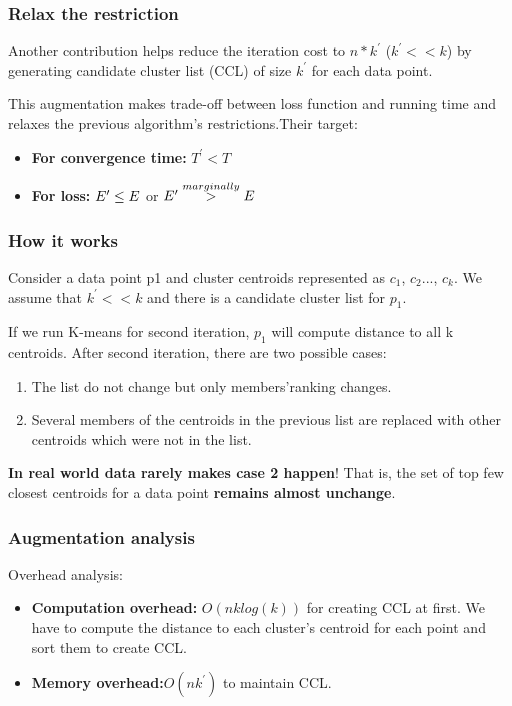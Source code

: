 \documentclass[9pt]{beamer}
\newcommand{\ccp}[1]{{\color{purple}#1}}
\begin{document}
\begin{frame}
	\frametitle{Relax the restriction}
	Another contribution helps reduce the iteration cost to $n * k^{\prime}$ ($k^{\prime} << k$) by generating \ccp{candidate cluster list (CCL)} of size $k^{\prime}$ for each data point. \par
	This augmentation makes trade-off between loss function and running time and relaxes the previous algorithm's restrictions.Their target:
	\begin{itemize}
		\item \textbf{For convergence time:} $T^{\prime} < T$
		\item \textbf{For loss:} $E^{\prime} \le E \space $ or $ \space E^{\prime} \overset{marginally}{>} E$
	\end{itemize}
\end{frame}

\begin{frame}
	\frametitle{How it works}
	Consider a data point p1 and cluster centroids represented as $c_1$, $c_2$..., $c_k$. We assume that $k^{\prime} << k $ and there is a candidate cluster list for $p_1$.\par
	\pause
	If we run K-means for second iteration, $p_1$ will compute distance to all k centroids. After second iteration, there are two possible cases:
	\begin{enumerate}
		\item The list do not change but only members'ranking changes.
		\item Several members of the centroids in the previous list are replaced with other centroids which were not in the list.
	\end{enumerate}
	\textbf{In real world data rarely makes case 2 happen}! That is, the set of top few closest centroids for a data point \textbf{remains almost unchange}.
\end{frame}

\begin{frame}
	\frametitle{Augmentation analysis}
	Overhead analysis:
	\begin{itemize}
		\item \textbf{Computation overhead:} $O(nklog(k))$ for creating CCL at first. We have to compute the distance to each cluster's centroid for each point and sort them to create CCL.
		\item \textbf{Memory overhead:}$ O(nk^{\prime})$ to maintain CCL.
	\end{itemize}
\end{frame}
\end{document}
